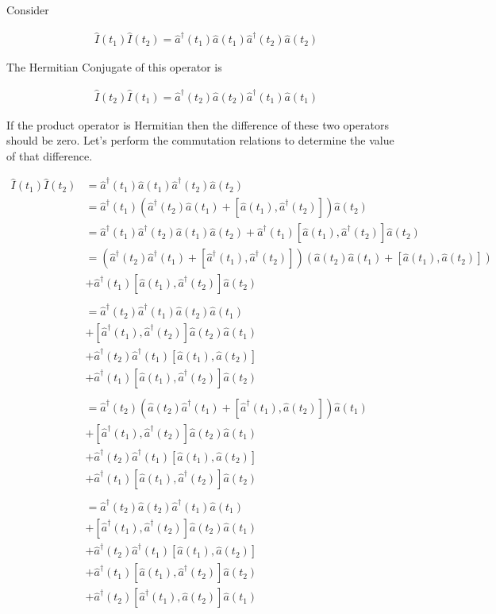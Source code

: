 \documentclass[12pt]{article}
\begin{document}
Consider

\begin{align}
\hat{I}(t_1)\hat{I}(t_2) = \hat{a}^{\dag}(t_1)\hat{a}(t_1) \hat{a}^{\dag}(t_2)\hat{a}(t_2)
\end{align}

The Hermitian Conjugate of this operator is 

\begin{align}
\hat{I}(t_2)\hat{I}(t_1) = \hat{a}^{\dag}(t_2)\hat{a}(t_2) \hat{a}^{\dag}(t_1)\hat{a}(t_1)
\end{align}

If the product operator is Hermitian then the difference of these two operators should be zero. Let's perform the commutation relations to determine the value of that difference.

\begin{align*}
\hat{I}(t_1)\hat{I}(t_2) &= \hat{a}^{\dag}(t_1)\hat{a}(t_1) \hat{a}^{\dag}(t_2)\hat{a}(t_2)\\
&= \hat{a}^{\dag}(t_1)(\hat{a}^{\dag}(t_2)\hat{a}(t_1) + [\hat{a}(t_1),\hat{a}^{\dag}(t_2)])\hat{a}(t_2)\\
&= \hat{a}^{\dag}(t_1) \hat{a}^{\dag}(t_2)\hat{a}(t_1) \hat{a}(t_2) + \hat{a}^{\dag}(t_1)[\hat{a}(t_1),\hat{a}^{\dag}(t_2)]\hat{a}(t_2)\\
&= (\hat{a}^{\dag}(t_2)\hat{a}^{\dag}(t_1) + [\hat{a}^{\dag}(t_1),\hat{a}^{\dag}(t_2)])(\hat{a}(t_2)\hat{a}(t_1) + [\hat{a}(t_1),\hat{a}(t_2)])\\
&+ \hat{a}^{\dag}(t_1)[\hat{a}(t_1),\hat{a}^{\dag}(t_2)]\hat{a}(t_2)\\
&\\
&= \hat{a}^{\dag}(t_2)\hat{a}^{\dag}(t_1)\hat{a}(t_2)\hat{a}(t_1)\\
&+ [\hat{a}^{\dag}(t_1),\hat{a}^{\dag}(t_2)] \hat{a}(t_2)\hat{a}(t_1)\\
&+ \hat{a}^{\dag}(t_2)\hat{a}^{\dag}(t_1)[\hat{a}(t_1),\hat{a}(t_2)]\\
&+ \hat{a}^{\dag}(t_1)[\hat{a}(t_1),\hat{a}^{\dag}(t_2)]\hat{a}(t_2)\\
&\\
&= \hat{a}^{\dag}(t_2)(\hat{a}(t_2)\hat{a}^{\dag}(t_1) + [\hat{a}^{\dag}(t_1),\hat{a}(t_2)])\hat{a}(t_1)\\
&+ [\hat{a}^{\dag}(t_1),\hat{a}^{\dag}(t_2)] \hat{a}(t_2)\hat{a}(t_1)\\
&+ \hat{a}^{\dag}(t_2)\hat{a}^{\dag}(t_1)[\hat{a}(t_1),\hat{a}(t_2)]\\
&+ \hat{a}^{\dag}(t_1)[\hat{a}(t_1),\hat{a}^{\dag}(t_2)]\hat{a}(t_2)\\
&\\
&= \hat{a}^{\dag}(t_2)\hat{a}(t_2)\hat{a}^{\dag}(t_1)\hat{a}(t_1)\\
&+ [\hat{a}^{\dag}(t_1),\hat{a}^{\dag}(t_2)] \hat{a}(t_2)\hat{a}(t_1)\\
&+ \hat{a}^{\dag}(t_2)\hat{a}^{\dag}(t_1)[\hat{a}(t_1),\hat{a}(t_2)]\\
&+ \hat{a}^{\dag}(t_1)[\hat{a}(t_1),\hat{a}^{\dag}(t_2)]\hat{a}(t_2)\\
&+\hat{a}^{\dag}(t_2)[\hat{a}^{\dag}(t_1),\hat{a}(t_2)]\hat{a}(t_1)
\end{align*}
\end{document}
